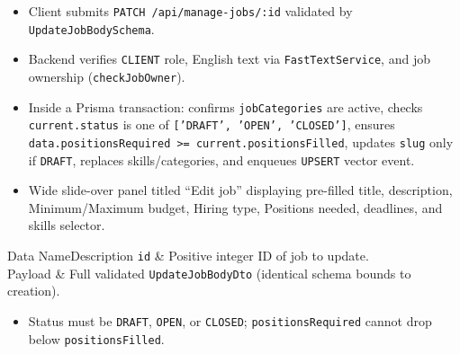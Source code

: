 \begin{itemize}[leftmargin=1.6em,topsep=3pt,itemsep=2pt,parsep=0pt,label=$\bullet$]
    \item Client submits \texttt{PATCH /api/manage-jobs/:id} validated by \texttt{UpdateJobBodySchema}.
    \item Backend verifies \texttt{CLIENT} role, English text via \texttt{FastTextService}, and job ownership (\texttt{checkJobOwner}).
    \item Inside a Prisma transaction: confirms \texttt{jobCategories} are active, checks \texttt{current.status} is one of \texttt{['DRAFT', 'OPEN', 'CLOSED']}, ensures \texttt{data.positionsRequired >= current.positionsFilled}, updates \texttt{slug} only if \texttt{DRAFT}, replaces skills/categories, and enqueues \texttt{UPSERT} vector event.
\end{itemize}

\begin{itemize}[leftmargin=1.6em,topsep=3pt,itemsep=2pt,parsep=0pt,label=$\bullet$]
    \item Wide slide-over panel titled ``Edit job'' displaying pre-filled title, description, Minimum/Maximum budget, Hiring type, Positions needed, deadlines, and skills selector.
\end{itemize}


\begin{specdatatable}{Data Name}{Description}
\texttt{id} & Positive integer ID of job to update.\\ \hline
Payload & Full validated \texttt{UpdateJobBodyDto} (identical schema bounds to creation).\\ \hline
\end{specdatatable}

\begin{itemize}[leftmargin=1.6em,topsep=3pt,itemsep=2pt,parsep=0pt,label=$\bullet$]
    \item Status must be \texttt{DRAFT}, \texttt{OPEN}, or \texttt{CLOSED}; \texttt{positionsRequired} cannot drop below \texttt{positionsFilled}.
\end{itemize}

